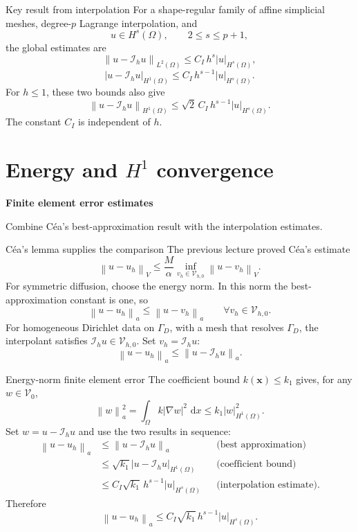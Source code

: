 \documentclass[11pt,aspectratio=169]{beamer}
\newcommand{\dd}{\,\mathrm{d}}
\newcommand{\Om}{\Omega}
\newcommand{\Gam}{\Gamma}
\newcommand{\Vzero}{\mathcal V_0}
\newcommand{\Vhzero}{\mathcal V_{h,0}}
\newcommand{\Ih}{\mathcal I_h}
\newcommand{\norm}[2][]{\left\lVert#2\right\rVert_{#1}}
\newcommand{\seminorm}[2][]{\left\lvert#2\right\rvert_{#1}}
\newcommand{\bx}{\bm x}
\begin{document}
\begin{frame}{Key result from interpolation}
For a shape-regular family of affine simplicial meshes, degree-$p$ Lagrange
interpolation, and
\[
  u\in H^s(\Om),
  \qquad 2\leq s\leq p+1,
\]
the global estimates are
\[
  \boxed{
  \norm[L^2(\Om)]{u-\Ih u}
  \leq C_I\,h^s\seminorm[H^s(\Om)]{u},}
\]
\[
  \boxed{
  \seminorm[H^1(\Om)]{u-\Ih u}
  \leq C_I\,h^{s-1}\seminorm[H^s(\Om)]{u}.}
\]
For $h\leq1$, these two bounds also give
\[
  \norm[H^1(\Om)]{u-\Ih u}
  \leq \sqrt{2}\,C_I\,h^{s-1}\seminorm[H^s(\Om)]{u}.
\]
The constant $C_I$ is independent of $h$.
\end{frame}

\section{Energy and \texorpdfstring{$H^1$}{H1} convergence}

\begin{frame}[plain]
  \centering
  \vfill
  {\LARGE\bfseries Finite element error estimates\par}
  \vspace{0.45cm}
  {\large Combine C\'ea's best-approximation result with the interpolation
  estimates.\par}
  \vfill
\end{frame}

\begin{frame}{C\'ea's lemma supplies the comparison}
The previous lecture proved C\'ea's estimate
\[
  \norm[V]{u-u_h}
  \leq \frac{M}{\alpha}
  \inf_{v_h\in\Vhzero}\norm[V]{u-v_h}.
\]
For symmetric diffusion, choose the energy norm. In this norm the
best-approximation constant is one, so
\[
  \norm[a]{u-u_h}
  \leq \norm[a]{u-v_h}
  \qquad\forall v_h\in\Vhzero.
\]
For homogeneous Dirichlet data on $\Gam_D$, with a mesh that resolves
$\Gam_D$, the interpolant satisfies $\Ih u\in\Vhzero$. Set
$v_h=\Ih u$:
\[
  \boxed{\norm[a]{u-u_h}\leq\norm[a]{u-\Ih u}.}
\]
\end{frame}

\begin{frame}{Energy-norm finite element error}
The coefficient bound $k(\bx)\leq k_1$ gives, for any $w\in\Vzero$,
\[
  \norm[a]{w}^2
  =\int_\Om k|\nabla w|^2\,\dd x
  \leq k_1\seminorm[H^1(\Om)]{w}^2.
\]
Set $w=u-\Ih u$ and use the two results in sequence:
\begin{align*}
  \norm[a]{u-u_h}
  &\leq \norm[a]{u-\Ih u}
    &&\text{(best approximation)}\\
  &\leq \sqrt{k_1}\seminorm[H^1(\Om)]{u-\Ih u}
    &&\text{(coefficient bound)}\\
  &\leq C_I\sqrt{k_1}\,h^{s-1}\seminorm[H^s(\Om)]{u}
    &&\text{(interpolation estimate).}
\end{align*}
Therefore
\[
  \boxed{\norm[a]{u-u_h}
  \leq C_I\sqrt{k_1}\,h^{s-1}\seminorm[H^s(\Om)]{u}.}
\]
\end{frame}
\end{document}
